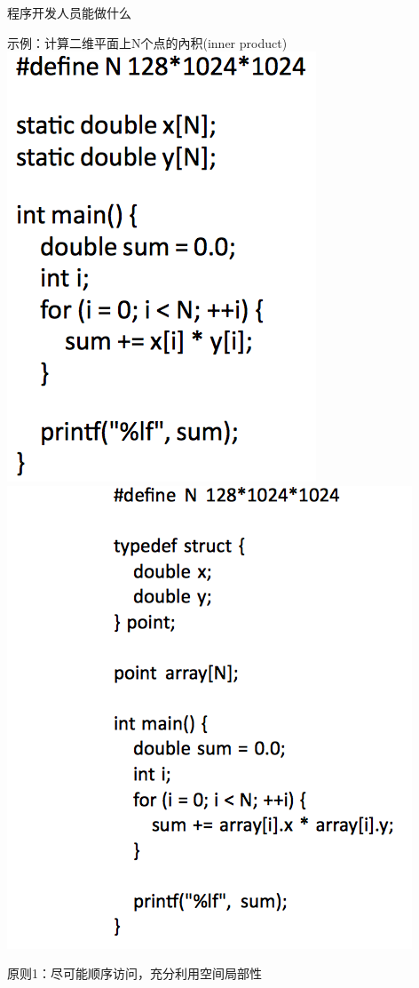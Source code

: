 \documentclass[handout]{beamer}
\begin{document}
\begin{CJK}{UTF8}{gbsn}
\begin{frame}{程序开发人员能做什么}
  \begin{block}{示例：计算二维平面上N个点的內积(inner product)}
    \pause
    \includegraphics[scale=0.3]{./images/inner-product-miss}
    \pause
    \includegraphics[scale=0.3]{./images/inner-product-hit}
    \pause
  \end{block}
  \begin{block}{原则1：尽可能顺序访问，充分利用空间局部性}
  \end{block}
\end{frame}


\end{CJK}
\end{document}
